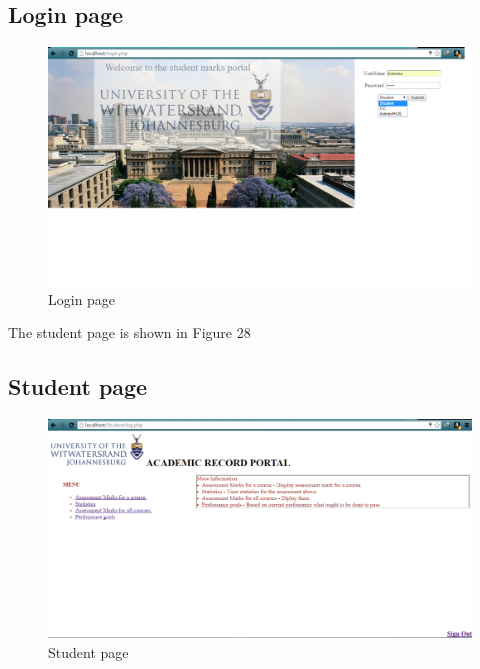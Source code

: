 \documentclass[10pt,onecolumn]{MainDocument}
\begin{document}
\subsection{Login page}
\begin{center}
\begin{figure}[h]
\centering
\includegraphics[trim = {0 0cm 0cm 0cm},clip, scale=0.5]{loginPage}
\caption{Login page}
\end{figure}
\end{center}

\newpage 

The student page is shown in Figure 28

\subsection{Student page}
\begin{center}
\begin{figure}[h]
\centering
\includegraphics[trim = {0 0cm 0cm 0cm},clip, scale=0.5]{studentPage}
\caption{Student page}
\end{figure}
\end{center}
\end{document}
